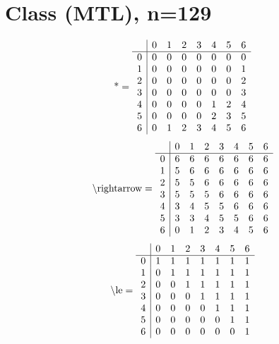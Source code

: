 \documentclass[11pt]{article}
\begin{document}
\section{Class (MTL), n=129}
\[\text{*} = 
\begin{array}{r | r r r r r r r}
 & 0 & 1 & 2 & 3 & 4 & 5 & 6 \\ \hline
0 & 0 & 0 & 0 & 0 & 0 & 0 & 0 \\
1 & 0 & 0 & 0 & 0 & 0 & 0 & 1 \\
2 & 0 & 0 & 0 & 0 & 0 & 0 & 2 \\
3 & 0 & 0 & 0 & 0 & 0 & 0 & 3 \\
4 & 0 & 0 & 0 & 0 & 1 & 2 & 4 \\
5 & 0 & 0 & 0 & 0 & 2 & 3 & 5 \\
6 & 0 & 1 & 2 & 3 & 4 & 5 & 6 \\
\end{array}
\]
\[\text{\textbackslash rightarrow} = 
\begin{array}{r | r r r r r r r}
 & 0 & 1 & 2 & 3 & 4 & 5 & 6 \\ \hline
0 & 6 & 6 & 6 & 6 & 6 & 6 & 6 \\
1 & 5 & 6 & 6 & 6 & 6 & 6 & 6 \\
2 & 5 & 5 & 6 & 6 & 6 & 6 & 6 \\
3 & 5 & 5 & 5 & 6 & 6 & 6 & 6 \\
4 & 3 & 4 & 5 & 5 & 6 & 6 & 6 \\
5 & 3 & 3 & 4 & 5 & 5 & 6 & 6 \\
6 & 0 & 1 & 2 & 3 & 4 & 5 & 6 \\
\end{array}
\]
\[\text{\textbackslash le} = 
\begin{array}{r | r r r r r r r}
 & 0 & 1 & 2 & 3 & 4 & 5 & 6 \\ \hline
0 & 1 & 1 & 1 & 1 & 1 & 1 & 1 \\
1 & 0 & 1 & 1 & 1 & 1 & 1 & 1 \\
2 & 0 & 0 & 1 & 1 & 1 & 1 & 1 \\
3 & 0 & 0 & 0 & 1 & 1 & 1 & 1 \\
4 & 0 & 0 & 0 & 0 & 1 & 1 & 1 \\
5 & 0 & 0 & 0 & 0 & 0 & 1 & 1 \\
6 & 0 & 0 & 0 & 0 & 0 & 0 & 1 \\
\end{array}
\]
\end{document}

